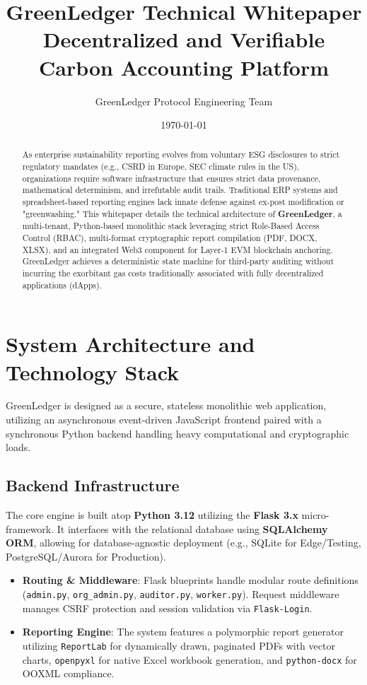 \documentclass[12pt,a4paper]{article}
\title{\textbf{GreenLedger Technical Whitepaper}\\
\large Decentralized and Verifiable Carbon Accounting Platform}
\author{GreenLedger Protocol Engineering Team}
\date{\today}
\begin{document}
\maketitle

\begin{abstract}
As enterprise sustainability reporting evolves from voluntary ESG disclosures to strict regulatory mandates (e.g., CSRD in Europe, SEC climate rules in the US), organizations require software infrastructure that ensures strict data provenance, mathematical determinism, and irrefutable audit trails. Traditional ERP systems and spreadsheet-based reporting engines lack innate defense against ex-post modification or "greenwashing." 
This whitepaper details the technical architecture of \textbf{GreenLedger}, a multi-tenant, Python-based monolithic stack leveraging strict Role-Based Access Control (RBAC), multi-format cryptographic report compilation (PDF, DOCX, XLSX), and an integrated Web3 component for Layer-1 EVM blockchain anchoring. GreenLedger achieves a deterministic state machine for third-party auditing without incurring the exorbitant gas costs traditionally associated with fully decentralized applications (dApps).
\end{abstract}

\tableofcontents
\newpage

\section{System Architecture and Technology Stack}

GreenLedger is designed as a secure, stateless monolithic web application, utilizing an asynchronous event-driven JavaScript frontend paired with a synchronous Python backend handling heavy computational and cryptographic loads.

\subsection{Backend Infrastructure}
The core engine is built atop \textbf{Python 3.12} utilizing the \textbf{Flask 3.x} micro-framework. It interfaces with the relational database using \textbf{SQLAlchemy ORM}, allowing for database-agnostic deployment (e.g., SQLite for Edge/Testing, PostgreSQL/Aurora for Production).
\begin{itemize}[noitemsep]
    \item \textbf{Routing \& Middleware}: Flask blueprints handle modular route definitions (\texttt{admin.py}, \texttt{org\_admin.py}, \texttt{auditor.py}, \texttt{worker.py}). Request middleware manages CSRF protection and session validation via \texttt{Flask-Login}.
    \item \textbf{Reporting Engine}: The system features a polymorphic report generator utilizing \texttt{ReportLab} for dynamically drawn, paginated PDFs with vector charts, \texttt{openpyxl} for native Excel workbook generation, and \texttt{python-docx} for OOXML compliance.
\end{itemize}
\end{document}
